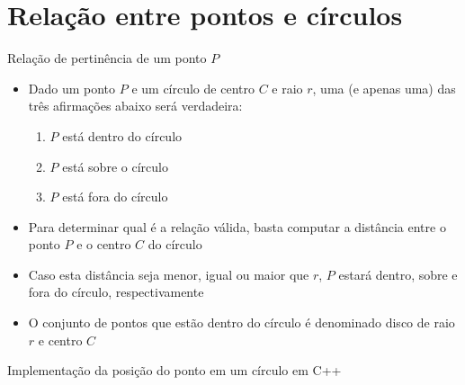 \section{Relação entre pontos e círculos}

\begin{frame}[fragile]{Relação de pertinência de um ponto $P$}

    \begin{itemize}
        \item Dado um ponto $P$ e um círculo de centro $C$ e raio $r$, uma (e apenas uma) das três 
            afirmações abaixo será verdadeira:
        \pause

        \begin{enumerate}
            \item $P$ está dentro do círculo
        \pause
            \item $P$ está sobre o círculo
        \pause
            \item $P$ está fora do círculo
        \end{enumerate}
        \pause

        \item Para determinar qual é a relação válida, basta computar a distância entre o ponto $P$
            e o centro $C$ do círculo
        \pause

        \item Caso esta distância seja menor, igual ou maior que $r$, $P$ estará dentro, sobre e 
            fora do círculo, respectivamente
        \pause

        \item O conjunto de pontos que estão dentro do círculo é denominado disco de raio $r$ e
            centro $C$
   \end{itemize}
\end{frame}

\begin{frame}[fragile]{Implementação da posição do ponto em um círculo em C++}
\end{frame}

